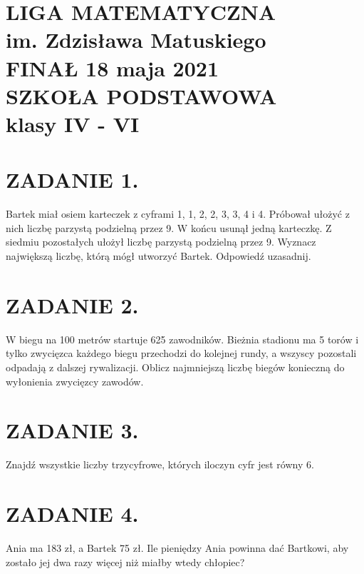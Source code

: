 \documentclass[10pt]{article}
\begin{document}
\section*{LIGA MATEMATYCZNA \\
 im. Zdzisława Matuskiego \\
 FINAŁ 18 maja 2021 \\
 SZKOŁA PODSTAWOWA \\
 klasy IV - VI}
\section*{ZADANIE 1.}
Bartek miał osiem karteczek z cyframi 1, 1, 2, 2, 3, 3, 4 i 4. Próbował ułożyć z nich liczbę parzystą podzielną przez 9. W końcu usunął jedną karteczkę. Z siedmiu pozostałych ułożył liczbę parzystą podzielną przez 9. Wyznacz największą liczbę, którą mógł utworzyć Bartek. Odpowiedź uzasadnij.

\section*{ZADANIE 2.}
W biegu na 100 metrów startuje 625 zawodników. Bieżnia stadionu ma 5 torów i tylko zwycięzca każdego biegu przechodzi do kolejnej rundy, a wszyscy pozostali odpadają z dalszej rywalizacji. Oblicz najmniejszą liczbę biegów konieczną do wyłonienia zwycięzcy zawodów.

\section*{ZADANIE 3.}
Znajdź wszystkie liczby trzycyfrowe, których iloczyn cyfr jest równy 6.

\section*{ZADANIE 4.}
Ania ma 183 zł, a Bartek 75 zł. Ile pieniędzy Ania powinna dać Bartkowi, aby zostało jej dwa razy więcej niż miałby wtedy chłopiec?
\end{document}
